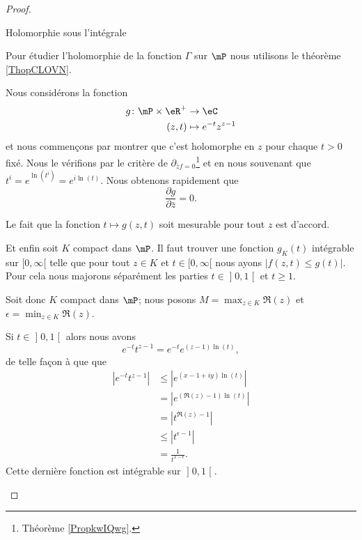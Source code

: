 \begin{proof}
    \begin{subproof}
        \item[Holomorphie sous l'intégrale]

            Pour étudier l'holomorphie de la fonction \( \Gamma\) sur \( \mP\) nous utilisons le théorème \ref{ThopCLOVN}.

            Nous considérons la fonction
            \begin{equation}
                \begin{aligned}
                    g\colon \mP\times \eR^+&\to \eC \\
                    (z,t)&\mapsto  e^{-t}z^{z-1}
                \end{aligned}
            \end{equation}
            et nous commençons par montrer que c'est holomorphe en \( z\) pour chaque \( t>0\) fixé. Nous le vérifions par le critère de \( \partial_{\bar zf=0}\)\footnote{Théorème \ref{PropkwIQwg}.} et en nous souvenant que \( t^i= e^{\ln(t^i)}= e^{i\ln(t)}\). Nous obtenons rapidement que
            \begin{equation}
                \frac{ \partial g }{ \partial \bar z }=0.
            \end{equation}

            Le fait que la fonction \( t\mapsto g(z,t)\) soit mesurable pour tout \( z\) est d'accord.

            Et enfin soit \( K\) compact dans \( \mP\). Il faut trouver une fonction \( g_K(t)\) intégrable sur \( \mathopen[ 0 , \infty [\) telle que pour tout \( z\in K\) et \( t\in\mathopen[ 0 , \infty [\) nous ayons \( | f(z,t)\leq g(t) |\). Pour cela nous majorons séparément les parties \( t\in\mathopen] 0 , 1 \mathclose[\) et \( t\geq 1\). 

            Soit donc \( K\) compact dans \( \mP\); nous posons \( M=\max_{z\in K}\Re(z)\) et \( \epsilon=\min_{z\in K}\Re(z)\).

            Si \( t\in \mathopen] 0 , 1 \mathclose[\) alors nous avons 
            \begin{equation}
                e^{-t}t^{z-1}= e^{-t} e^{(z-1)\ln(t)},
            \end{equation}
            de telle façon à que que
            \begin{subequations}
                \begin{align}
                    |  e^{-t}t^{z-1} |&\leq|  e^{(x-1+iy)\ln(t)} |\\
                    &=|   e^{(\Re(z)-1)\ln(t)} |\\
                    &=| t^{\Re(z)-1} |\\
                    &\leq | t^{\epsilon-1} |\\
                    &=\frac{1}{ t^{1-\epsilon} }.
                \end{align}
            \end{subequations}
            Cette dernière fonction est intégrable sur \( \mathopen] 0 , 1 \mathclose[\).


\end{subproof}
\end{proof}
